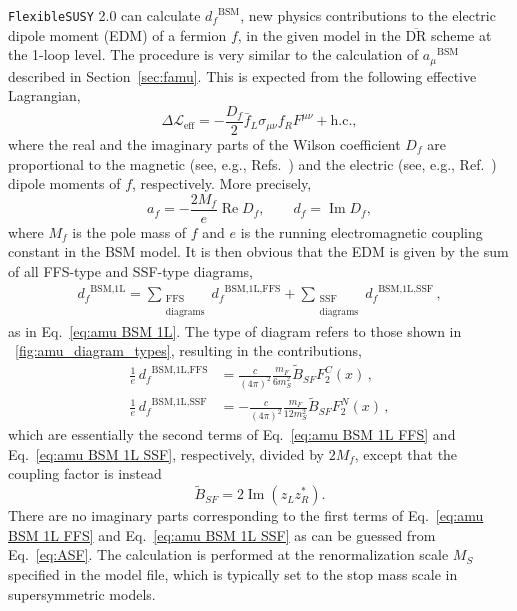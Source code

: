 \documentclass[final,3p,11pt,pdflatex]{elsarticle}
\makeatletter
\newcommand{\fs}{\texttt{FlexibleSUSY}\@\xspace}
\newcommand{\fstwo}{\fs 2.0\@\xspace}
\newcommand{\ol}[1]{\overline{#1}}
\newcommand{\DRbar}{\ensuremath{\ol{\text{DR}}}\xspace}
\newcommand{\BSM}{\ensuremath{\text{BSM}}\xspace}
\newcommand{\MS}{\ensuremath{M_S}\xspace}
\newcommand{\amu}{\ensuremath{a_\mu}\xspace}
\newcommand{\amuBSM}{\ensuremath{\amu^{\BSM}}\xspace}
\newcommand{\edm}[1]{\ensuremath{d_{#1}}\xspace}
\newcommand{\edmBSM}[1]{\ensuremath{\edm{#1}^{\BSM}}\xspace}
\newcommand{\figref}[1]{\figurename~\ref{#1}}
\newcommand{\secref}[1]{Section~\ref{#1}}
\DeclareMathOperator{\re}{Re}
\DeclareMathOperator{\im}{Im}
\makeatother
\begin{document}
\fstwo can calculate $\edmBSM{f}$, new physics contributions to the
electric dipole moment (EDM) of a fermion $f$, in the given model
in the \DRbar scheme at the 1-loop level.
The procedure is very similar to the calculation of \amuBSM
described in \secref{sec:famu}.
This is expected from the following effective Lagrangian,
\begin{equation}
  \Delta \mathcal{L}_\text{eff} =
  - \frac{D_f}{2}\bar{f}_L \sigma_{\mu\nu} f_R F^{\mu\nu} + \mathrm{h.c.},
\end{equation}
where the real and the imaginary parts of the Wilson coefficient
$D_f$ are proportional to the magnetic
(see, e.g., Refs.~\cite{Cho:2001hx,Baek:2002cc})
and the electric (see, e.g., Ref.~\cite{Pokorski:1999hz}) dipole moments
of $f$, respectively.
More precisely,
\begin{equation}
  a_f = - \frac{2 M_f}{e} \re D_f, \qquad
  \edm{f} = \im D_f,
\end{equation}
where $M_f$ is the pole mass of $f$
and $e$ is the running electromagnetic coupling constant in the BSM model.
It is then obvious that
the EDM is given by the sum of all FFS-type and SSF-type diagrams,
\begin{align}
  \edm{f}^{\BSM\text{,1L}} =
  \sum_{\substack{\text{FFS}\\\text{diagrams}}}
  \edm{f}^{\BSM\text{,1L,FFS}}
  + \sum_{\substack{\text{SSF}\\\text{diagrams}}}
  \edm{f}^{\BSM\text{,1L,SSF}}
  \,,
\end{align}
as in Eq.\ \eqref{eq:amu BSM 1L}.  The type of diagram refers to those
shown in \figref{fig:amu_diagram_types}, resulting in the contributions,
\begin{align}
  \frac{1}{e}\,\edm{f}^{\BSM\text{,1L,FFS}} &=
  \frac{c}{(4\pi)^2}
    \frac{m_F}{6{m_{S}^2}} \widetilde{B}_{SF} F_2^C(x)
  \,, \\
  \frac{1}{e}\,\edm{f}^{\BSM\text{,1L,SSF}} &=
  - \frac{c}{(4\pi)^2}
    \frac{m_F}{12{m_{S}^2}} \widetilde{B}_{SF} F_2^N(x)
  \,,
\end{align}
which are essentially the second terms of Eq.\ \eqref{eq:amu BSM 1L FFS} and
Eq.\ \eqref{eq:amu BSM 1L SSF}, respectively, divided by $2 M_f$, except that
the coupling factor is instead
\begin{equation}
  \widetilde{B}_{SF} = 2 \im ( z_L z_R^* ) .
\end{equation}
There are no imaginary parts corresponding to
the first terms of Eq.\ \eqref{eq:amu BSM 1L FFS} and Eq.\ \eqref{eq:amu BSM 1L SSF}
as can be guessed from Eq.\ \eqref{eq:ASF}.
The calculation is performed at the renormalization scale $\MS$ specified
in the model file, which is typically set to the stop mass scale
in supersymmetric models.
\end{document}
